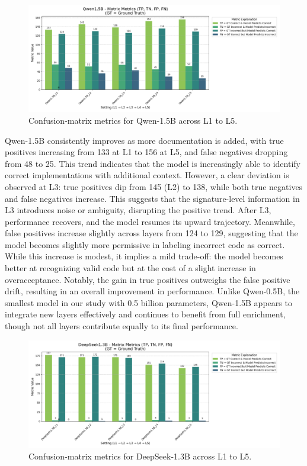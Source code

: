 \documentclass[a4paper]{usiinfbachelorproject}
\begin{document}
\begin{figure}[H]\centering
  \includegraphics[width=\linewidth]{figures/Qwen1.5B_matrix_metrics.png}
  \caption{Confusion-matrix metrics for Qwen-1.5B across L1 to L5.}
  \label{fig:qwen15-matrix}
\end{figure}
\noindent
Qwen-1.5B consistently improves as more documentation is added, with true positives increasing from 133 at L1 to 156 at L5, and false negatives dropping from 48 to 25. This trend indicates that the model is increasingly able to identify correct implementations with additional context. However, a clear deviation is observed at L3: true positives dip from 145 (L2) to 138, while both true negatives and false negatives increase. This suggests that the signature-level information in L3 introduces noise or ambiguity, disrupting the positive trend. After L3, performance recovers, and the model resumes its upward trajectory. Meanwhile, false positives increase slightly across layers from 124 to 129, suggesting that the model becomes slightly more permissive in labeling incorrect code as correct. While this increase is modest, it implies a mild trade-off: the model becomes better at recognizing valid code but at the cost of a slight increase in overacceptance. Notably, the gain in true positives outweighs the false positive drift, resulting in an overall improvement in performance. Unlike Qwen-0.5B, the smallest model in our study with 0.5 billion parameters, Qwen-1.5B appears to integrate new layers effectively and continues to benefit from full enrichment, though not all layers contribute equally to its final performance.
\begin{figure}[H]\centering
  \includegraphics[width=\linewidth]{figures/DeepSeek1.3B_matrix_metrics.png}
  \caption{Confusion-matrix metrics for DeepSeek-1.3B across L1 to L5.}
  \label{fig:deepseek-matrix}
\end{figure}
\end{document}
